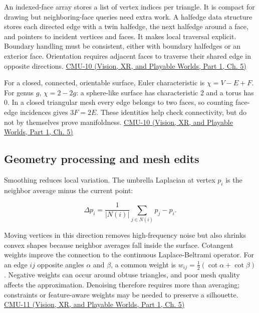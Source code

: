 An indexed-face array stores a list of vertex indices per triangle. It is compact for drawing but neighboring-face queries need extra work. A halfedge data structure stores each directed edge with a twin halfedge, the next halfedge around a face, and pointers to incident vertices and faces. It makes local traversal explicit. Boundary handling must be consistent, either with boundary halfedges or an exterior face. Orientation requires adjacent faces to traverse their shared edge in opposite directions. \href{../07-Vision-XR-and-Playable-Worlds-P01/main.pdf\#nameddest=04-visual-computing-ii-ch036-cmu-10---meshes-and-manifolds}{CMU-10 (Vision, XR, and Playable Worlds, Part 1, Ch. 5)}

For a closed, connected, orientable surface, Euler characteristic is \(\chi=V-E+F\). For genus \(g\), \(\chi=2-2g\): a sphere-like surface has characteristic 2 and a torus has 0. In a closed triangular mesh every edge belongs to two faces, so counting face-edge incidences gives \(3F=2E\). These identities help check connectivity, but do not by themselves prove manifoldness. \href{../07-Vision-XR-and-Playable-Worlds-P01/main.pdf\#nameddest=04-visual-computing-ii-ch036-cmu-10---meshes-and-manifolds}{CMU-10 (Vision, XR, and Playable Worlds, Part 1, Ch. 5)}

\subsection{Geometry processing and mesh edits}\label{03-visual-computing-i-ch002-geometry-processing-and-mesh-edits}

\hypertarget{03-visual-computing-i-ch002-geometry-processing-and-mesh-edits}{}

Smoothing reduces local variation. The umbrella Laplacian at vertex \(p_i\) is the neighbor average minus the current point:

\[
\Delta p_i=\frac1{|N(i)|}\sum_{j\in N(i)}p_j-p_i.
\]

Moving vertices in this direction removes high-frequency noise but also shrinks convex shapes because neighbor averages fall inside the surface. Cotangent weights improve the connection to the continuous Laplace-Beltrami operator. For an edge \(ij\) opposite angles \(\alpha\) and \(\beta\), a common weight is \(w_{ij}=\tfrac12(\cot\alpha+\cot\beta)\). Negative weights can occur around obtuse triangles, and poor mesh quality affects the approximation. Denoising therefore requires more than averaging; constraints or feature-aware weights may be needed to preserve a silhouette. \href{../07-Vision-XR-and-Playable-Worlds-P01/main.pdf\#nameddest=04-visual-computing-ii-ch036-cmu-11---digital-geometry-processing}{CMU-11 (Vision, XR, and Playable Worlds, Part 1, Ch. 5)}

